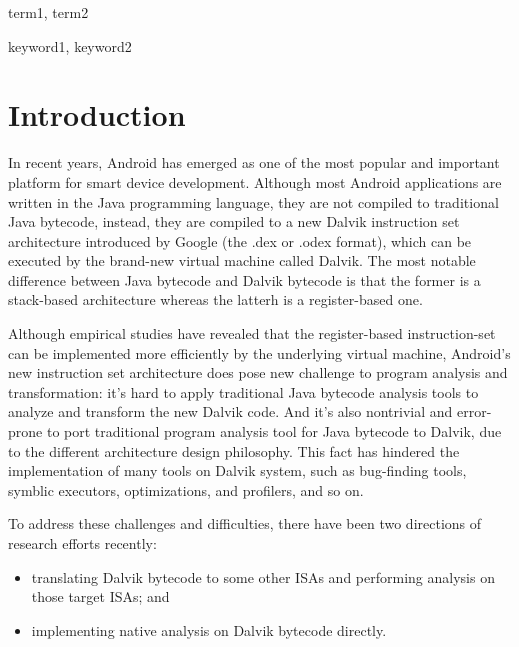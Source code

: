 \documentclass[preprint, cm]{sigplanconf}
\begin{document}

\terms
term1, term2

\keywords
keyword1, keyword2

\section{Introduction}\label{sec-introduction}
In recent years, Android has emerged as one of the most popular and
important platform for smart device development. Although most
Android applications are written in the Java programming language, they
are not compiled to traditional Java bytecode, instead, they
are compiled to a new Dalvik instruction set architecture
introduced by Google (the .dex or .odex format), which can
be executed by the brand-new virtual machine called Dalvik. The most notable
difference between Java bytecode and Dalvik bytecode is that the 
former is a stack-based architecture whereas the latterh is
a register-based one. 

Although empirical studies \cite{} have revealed that the register-based
instruction-set can be implemented more efficiently by the underlying
virtual machine, Android's new instruction set architecture 
does pose new challenge to program analysis and transformation: it's hard
to apply traditional Java bytecode analysis tools to analyze
and transform the new Dalvik code. And it's also nontrivial and
error-prone to port traditional program analysis tool for
Java bytecode
to Dalvik, due to the different architecture design philosophy. This
fact has hindered the implementation of many tools on Dalvik system, such
as bug-finding tools, symblic executors, optimizations, and profilers, and so on.

To address these challenges and difficulties, there have been two
directions of research efforts recently:
\begin{itemize}
  \item translating Dalvik bytecode to some other ISAs and
    performing analysis on those target ISAs; and
  \item implementing native analysis on Dalvik bytecode directly.
\end{itemize}
\end{document}
